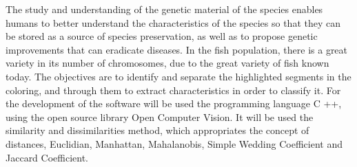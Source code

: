 The study and understanding of the genetic material of the species enables humans to better understand the characteristics of the species so that they can be stored as a source of species preservation, as well as to propose genetic improvements that can eradicate diseases. In the fish population, there is a great variety in its number of chromosomes, due to the great variety of fish known today. The objectives are to identify and separate the highlighted segments in the coloring, and through them to extract characteristics in order to classify it. For the development of the software will be used the programming language C ++, using the open source library Open Computer Vision. It will be used the similarity and dissimilarities method, which appropriates the concept of distances, Euclidian, Manhattan, Mahalanobis, Simple Wedding Coefficient and Jaccard Coefficient.